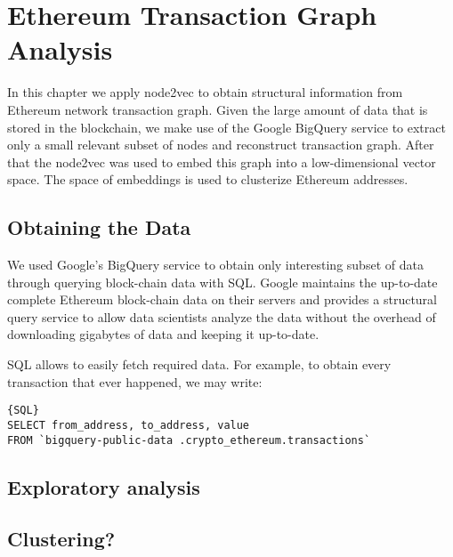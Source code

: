 \chapter{Ethereum Transaction Graph Analysis}\label{chap:3}

In this chapter we apply node2vec to obtain structural information from Ethereum network transaction graph. Given the large amount of data that is stored in the blockchain, we make use of the Google BigQuery service to extract only a small relevant subset of nodes and reconstruct transaction graph. After that the node2vec was used to embed this graph into a low-dimensional vector space. The space of embeddings is used to clusterize Ethereum addresses.

\section{Obtaining the Data}
We used Google's BigQuery service to obtain only interesting subset of data through querying block-chain data with SQL. Google maintains the up-to-date complete Ethereum block-chain data on their servers and provides a structural query service to allow data scientists analyze the data without the overhead of downloading gigabytes of data and keeping it up-to-date. 

SQL allows to easily fetch required data. For example, to obtain every transaction that ever happened, we may write:


\begin{lstlisting}{SQL}
SELECT from_address, to_address, value
FROM `bigquery-public-data .crypto_ethereum.transactions`
\end{lstlisting}

\section{Exploratory analysis}





\section{Clustering?}
